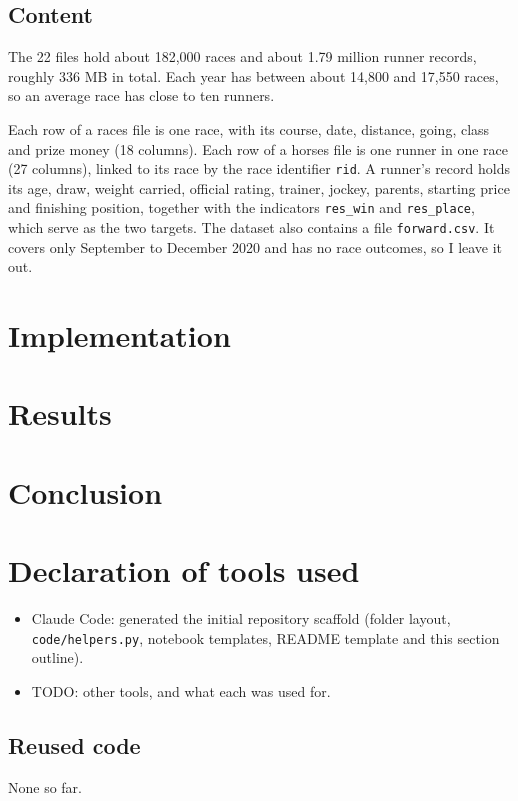 \subsection{Content}
The 22 files hold about 182,000 races and about 1.79 million runner records, roughly 336 MB in total. Each year has between about 14,800 and 17,550 races, so an average race has close to ten runners.

Each row of a races file is one race, with its course, date, distance, going, class and prize money (18 columns). Each row of a horses file is one runner in one race (27 columns), linked to its race by the race identifier \texttt{rid}. A runner's record holds its age, draw, weight carried, official rating, trainer, jockey, parents, starting price and finishing position, together with the indicators \texttt{res\_win} and \texttt{res\_place}, which serve as the two targets. The dataset also contains a file \texttt{forward.csv}. It covers only September to December 2020 and has no race outcomes, so I leave it out.


\section{Implementation}

\section{Results}

\section{Conclusion}

 


\appendix
\section{Declaration of tools used}
\begin{itemize}
  \item Claude Code: generated the initial repository scaffold (folder layout, \texttt{code/helpers.py},
        notebook templates, README template and this section outline).
  \item TODO: other tools, and what each was used for.
\end{itemize}

\subsection*{Reused code}
None so far.
